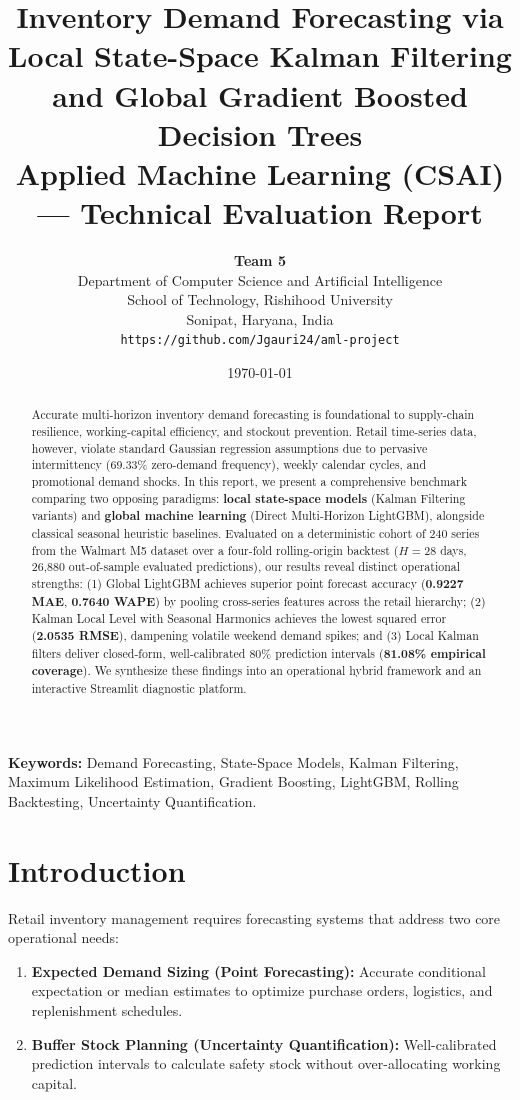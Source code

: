 \documentclass[11pt,a4paper]{article}
\title{\textbf{Inventory Demand Forecasting via Local State-Space Kalman Filtering and Global Gradient Boosted Decision Trees}\\
\large Applied Machine Learning (CSAI) --- Technical Evaluation Report}
\author{\textbf{Team 5} \\
Department of Computer Science and Artificial Intelligence \\
School of Technology, Rishihood University \\
Sonipat, Haryana, India \\
\texttt{https://github.com/Jgauri24/aml-project}}
\date{\today}
\begin{document}
\maketitle

\begin{abstract}
Accurate multi-horizon inventory demand forecasting is foundational to supply-chain resilience, working-capital efficiency, and stockout prevention. Retail time-series data, however, violate standard Gaussian regression assumptions due to pervasive intermittency (69.33\% zero-demand frequency), weekly calendar cycles, and promotional demand shocks. In this report, we present a comprehensive benchmark comparing two opposing paradigms: \textbf{local state-space models} (Kalman Filtering variants) and \textbf{global machine learning} (Direct Multi-Horizon LightGBM), alongside classical seasonal heuristic baselines. Evaluated on a deterministic cohort of 240 series from the Walmart M5 dataset over a four-fold rolling-origin backtest ($H=28$ days, 26,880 out-of-sample evaluated predictions), our results reveal distinct operational strengths:
(1) Global LightGBM achieves superior point forecast accuracy (\textbf{0.9227 MAE}, \textbf{0.7640 WAPE}) by pooling cross-series features across the retail hierarchy;
(2) Kalman Local Level with Seasonal Harmonics achieves the lowest squared error (\textbf{2.0535 RMSE}), dampening volatile weekend demand spikes; and
(3) Local Kalman filters deliver closed-form, well-calibrated 80\% prediction intervals (\textbf{81.08\% empirical coverage}). We synthesize these findings into an operational hybrid framework and an interactive Streamlit diagnostic platform.
\end{abstract}

\vspace{1em}
\noindent\textbf{Keywords:} Demand Forecasting, State-Space Models, Kalman Filtering, Maximum Likelihood Estimation, Gradient Boosting, LightGBM, Rolling Backtesting, Uncertainty Quantification.

\newpage
\tableofcontents
\newpage

\section{Introduction}
Retail inventory management requires forecasting systems that address two core operational needs:
\begin{enumerate}
    \item \textbf{Expected Demand Sizing (Point Forecasting):} Accurate conditional expectation or median estimates to optimize purchase orders, logistics, and replenishment schedules.
    \item \textbf{Buffer Stock Planning (Uncertainty Quantification):} Well-calibrated prediction intervals to calculate safety stock without over-allocating working capital.
\end{enumerate}
\end{document}
